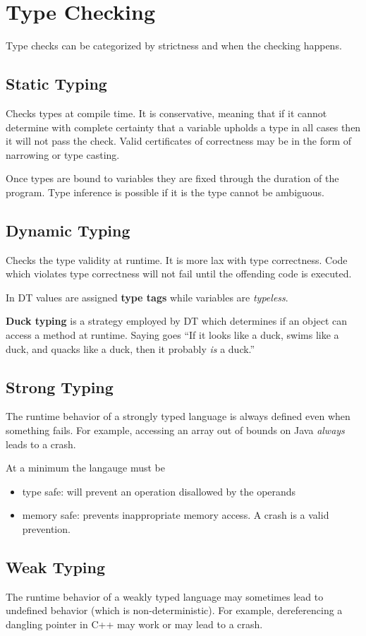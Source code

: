 \section{Type Checking}
Type checks can be categorized by strictness and when the checking happens.

\subsection*{Static Typing}
Checks types at compile time. It is conservative, meaning that if it
cannot determine with complete certainty that a variable upholds a type
in all cases then it will not pass the check. Valid certificates of
correctness may be in the form of narrowing or type casting.

Once types are bound to variables they are fixed through the duration of
the program. Type inference is possible if it is the type cannot be
ambiguous.

\subsection*{Dynamic Typing}
Checks the type validity at runtime. It is more lax with type
correctness. Code which violates type correctness will not fail until
the offending code is executed.

In DT values are assigned \textbf{type tags} while variables are
\textit{typeless}.

\textbf{Duck typing} is a strategy employed by DT which determines if an
object can access a method at runtime. Saying goes ``If it looks like a
duck, swims like a duck, and quacks like a duck, then it probably
\textit{is} a duck.''

\subsection*{Strong Typing}
The runtime behavior of a strongly typed language is always defined even
when something fails. For example, accessing an array out of bounds on
Java \textit{always} leads to a crash.

At a minimum the langauge must be
\begin{itemize}
  \item type safe: will prevent an operation disallowed by the operands
  \item memory safe: prevents inappropriate memory access. A crash is a valid prevention.
\end{itemize}

\subsection*{Weak Typing}
The runtime behavior of a weakly typed language may sometimes lead to
undefined behavior (which is non-deterministic). For example,
dereferencing a dangling pointer in C++ may work or may lead to a crash.
